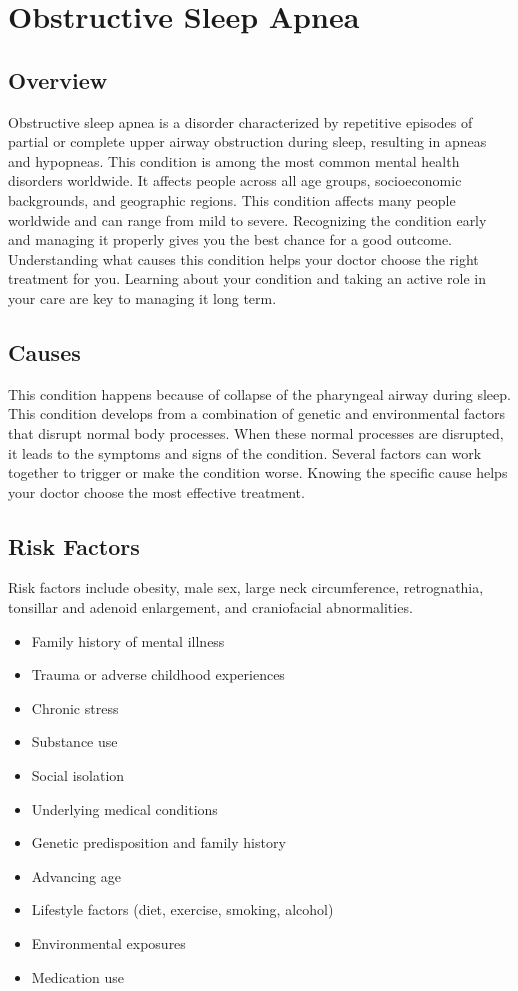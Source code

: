 \chapter{Obstructive Sleep Apnea}
\label{sec:throat:Obstructive Sleep Apnea}

\section{Overview}
Obstructive sleep apnea is a disorder characterized by repetitive episodes of partial or complete upper airway obstruction during sleep, resulting in apneas and hypopneas. This condition is among the most common mental health disorders worldwide. It affects people across all age groups, socioeconomic backgrounds, and geographic regions. This condition affects many people worldwide and can range from mild to severe. Recognizing the condition early and managing it properly gives you the best chance for a good outcome. Understanding what causes this condition helps your doctor choose the right treatment for you. Learning about your condition and taking an active role in your care are key to managing it long term.

\section{Causes}
This condition happens because of collapse of the pharyngeal airway during sleep. This condition develops from a combination of genetic and environmental factors that disrupt normal body processes. When these normal processes are disrupted, it leads to the symptoms and signs of the condition. Several factors can work together to trigger or make the condition worse. Knowing the specific cause helps your doctor choose the most effective treatment.

\section{Risk Factors}
Risk factors include obesity, male sex, large neck circumference, retrognathia, tonsillar and adenoid enlargement, and craniofacial abnormalities.

\begin{itemize}[noitemsep]
  \item Family history of mental illness
  \item Trauma or adverse childhood experiences
  \item Chronic stress
  \item Substance use
  \item Social isolation
  \item Underlying medical conditions
  \item Genetic predisposition and family history
  \item Advancing age
  \item Lifestyle factors (diet, exercise, smoking, alcohol)
  \item Environmental exposures
  \item Medication use
\end{itemize}

